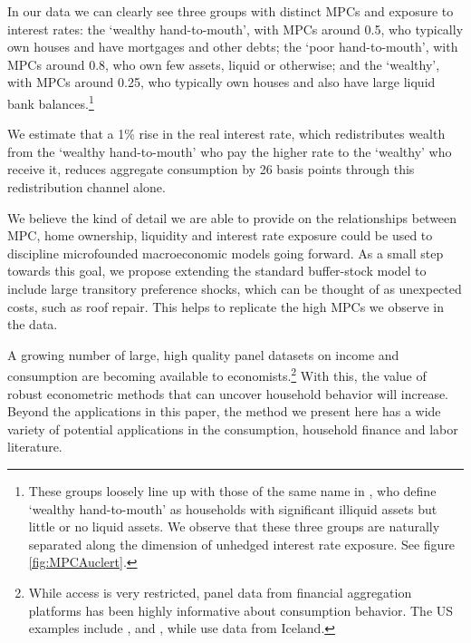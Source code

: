 \documentclass[titlepage]{\econtex}\newcommand{\texname}{ConsumptionHeterogeneity}
\begin{document}
In our data we can clearly see three groups with distinct MPCs and exposure to interest rates: the `wealthy hand-to-mouth', with MPCs around 0.5, who typically own houses and have mortgages and other debts; the `poor hand-to-mouth', with MPCs around 0.8, who own few assets, liquid or otherwise; and the `wealthy', with MPCs around 0.25, who typically own houses and also have large liquid bank balances.\footnote{These groups loosely line up with those of the same name in \cite{violante_wealthy_2014}, who define `wealthy hand-to-mouth' as households with significant illiquid assets but little or no liquid assets. We observe that these three groups are naturally separated along the dimension of unhedged interest rate exposure. See figure \ref{fig:MPCAuclert}.}

We estimate that a 1\% rise in the real interest rate, which redistributes wealth from the `wealthy hand-to-mouth' who pay the higher rate to the `wealthy' who receive it, reduces aggregate consumption by 26 basis points through this redistribution channel alone. 

We believe the kind of detail we are able to provide on the relationships between MPC, home ownership, liquidity and interest rate exposure could be used to discipline microfounded macroeconomic models going forward. As a small step towards this goal, we propose extending the standard buffer-stock model to include large transitory preference shocks, which can be thought of as unexpected costs, such as roof repair. This helps to replicate the high MPCs we observe in the data. 

A growing number of large, high quality panel datasets on income and consumption are becoming available to economists.\footnote{While access is very restricted, panel data from financial aggregation platforms has been highly informative about consumption behavior. The US examples include \cite{gelman_harnessing_2014}, \cite{ganong_consumer_2017} and \cite{baker_debt_2015}, while \cite{vardardottir_liquid_2016} use data from Iceland.} With this, the value of robust econometric methods that can uncover household behavior will increase. Beyond the applications in this paper, the method we present here has a wide variety of potential applications in the consumption, household finance and labor literature.
\end{document}
